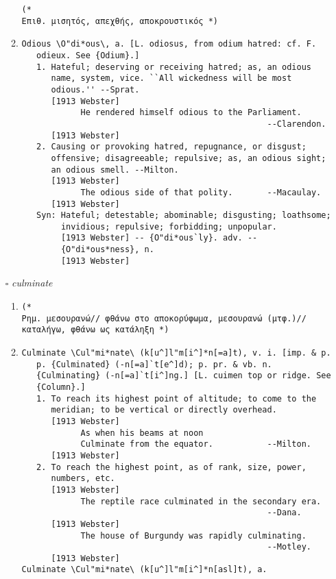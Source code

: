 \documentclass{article}
\begin{document}
\begin{itemize}
\begin{enumerate}
{\begin{lstlisting}
(* 
Επιθ. μισητός, απεχθής, αποκρουστικός *)
\end{lstlisting}}
\item{
\begin{lstlisting}
Odious \O"di*ous\, a. [L. odiosus, from odium hatred: cf. F.
   odieux. See {Odium}.]
   1. Hateful; deserving or receiving hatred; as, an odious
      name, system, vice. ``All wickedness will be most
      odious.'' --Sprat.
      [1913 Webster]
            He rendered himself odious to the Parliament.
                                                  --Clarendon.
      [1913 Webster]
   2. Causing or provoking hatred, repugnance, or disgust;
      offensive; disagreeable; repulsive; as, an odious sight;
      an odious smell. --Milton.
      [1913 Webster]
            The odious side of that polity.       --Macaulay.
      [1913 Webster]
   Syn: Hateful; detestable; abominable; disgusting; loathsome;
        invidious; repulsive; forbidding; unpopular.
        [1913 Webster] -- {O"di*ous`ly}. adv. --
        {O"di*ous*ness}, n.
        [1913 Webster]
\end{lstlisting}}
\end{enumerate}
\item[$\square$] \emph{ culminate }
\begin{enumerate}
\item{
\begin{lstlisting}
(* 
Ρημ. μεσουρανώ// φθάνω στο αποκορύφωμα, μεσουρανώ (μτφ.)// καταλήγω, φθάνω ως κατάληξη *)
\end{lstlisting}}
\item{
\begin{lstlisting}
Culminate \Cul"mi*nate\ (k[u^]l"m[i^]*n[=a]t), v. i. [imp. & p.
   p. {Culminated} (-n[=a]`t[e^]d); p. pr. & vb. n.
   {Culminating} (-n[=a]`t[i^]ng.] [L. cuimen top or ridge. See
   {Column}.]
   1. To reach its highest point of altitude; to come to the
      meridian; to be vertical or directly overhead.
      [1913 Webster]
            As when his beams at noon
            Culminate from the equator.           --Milton.
      [1913 Webster]
   2. To reach the highest point, as of rank, size, power,
      numbers, etc.
      [1913 Webster]
            The reptile race culminated in the secondary era.
                                                  --Dana.
      [1913 Webster]
            The house of Burgundy was rapidly culminating.
                                                  --Motley.
      [1913 Webster]
Culminate \Cul"mi*nate\ (k[u^]l"m[i^]*n[asl]t), a.

\end{lstlisting}}
\end{enumerate}
\end{itemize}
\end{document}
